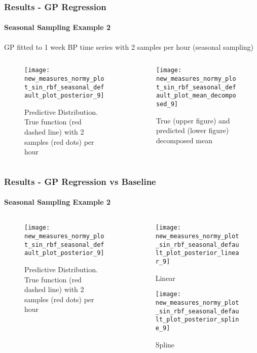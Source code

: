\documentclass[
	8pt, %
]{beamer}
\begin{document}
\begin{frame}
	\frametitle{Results - GP Regression}
	\framesubtitle{Seasonal Sampling Example  2}

	GP fitted to 1 week BP time series with 2 samples per hour (seasonal sampling)

		\begin{columns}[c] %
		\begin{column}{0.5\textwidth} %
				\begin{figure}
					\texttt{[image: new\_measures\_normy\_plot\_sin\_rbf\_seasonal\_default\_plot\_posterior\_9]}
					\caption{Predictive Distribution. True function (red dashed line) with 2 samples (red dots) per hour}
				\end{figure}
		\end{column}
		\begin{column}{0.5\textwidth} %
				\begin{figure}
					\texttt{[image: new\_measures\_normy\_plot\_sin\_rbf\_seasonal\_default\_plot\_mean\_decomposed\_9]}
					\caption{True (upper figure) and predicted (lower figure) decomposed mean}
				\end{figure}

		\end{column}
	\end{columns}

\end{frame}

\begin{frame}
	\frametitle{Results - GP Regression vs Baseline}
	\framesubtitle{Seasonal Sampling Example 2}

	\begin{columns}[c] %
		\begin{column}{0.5\textwidth} %
				\begin{figure}
					\texttt{[image: new\_measures\_normy\_plot\_sin\_rbf\_seasonal\_default\_plot\_posterior\_9]}
					\caption{Predictive Distribution. True function (red dashed line) with 2 samples (red dots) per hour}
				\end{figure}
		\end{column}
		\begin{column}{0.5\textwidth} %
				\begin{figure}
					\texttt{[image: new\_measures\_normy\_plot\_sin\_rbf\_seasonal\_default\_plot\_posterior\_linear\_9]}
					\caption{Linear}
				\end{figure}

				\begin{figure}
					\texttt{[image: new\_measures\_normy\_plot\_sin\_rbf\_seasonal\_default\_plot\_posterior\_spline\_9]}
					\caption{Spline}
				\end{figure}
		\end{column}
	\end{columns}

\end{frame}
\end{document}

